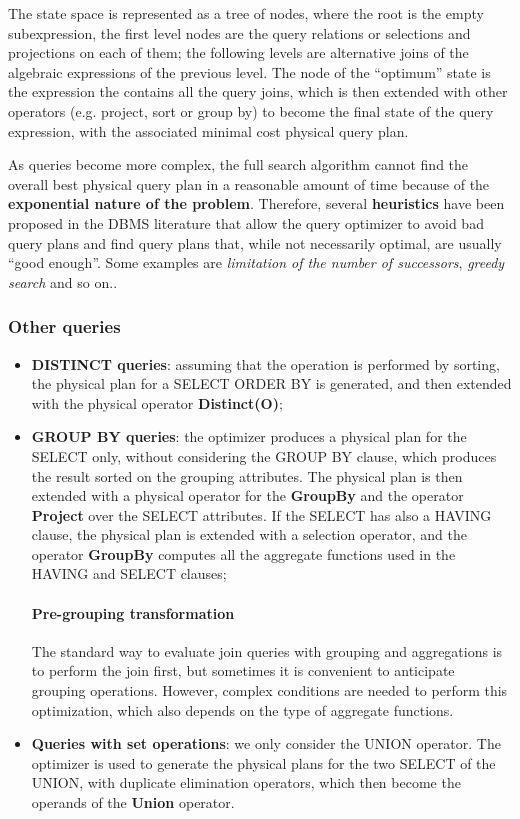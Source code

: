 The state space is represented as a tree of nodes, where the root is the empty subexpression, the first level nodes are the query relations or selections and projections on each of them; the following levels are alternative joins of the algebraic expressions of the previous level. The node of the “optimum” state is the expression the contains all the query joins, which is then extended with other operators (e.g. project, sort or group by) to become the final state of the query expression, with the associated minimal cost physical query plan. 

As queries become more complex, the full search algorithm cannot find the overall best physical query plan in a reasonable amount of time because of the \textbf{exponential nature of the problem}. Therefore, several \textbf{heuristics} have been proposed in the DBMS literature that allow the query optimizer to avoid bad query plans and find query plans that, while not necessarily optimal, are usually “good enough”. Some examples are \textit{limitation of the number of successors}, \textit{greedy search} and so on..

\subsubsection{Other queries}

\begin{itemize}

    \item \textbf{DISTINCT queries}: assuming that the operation is performed by sorting, the physical plan for a SELECT ORDER BY is generated, and then extended with the physical operator \textbf{Distinct(O)};
    
    \item \textbf{GROUP BY queries}: the optimizer produces a physical plan for the SELECT only, without considering the GROUP BY clause, which produces the result sorted on the grouping attributes. The physical plan is then extended with a physical operator for the \textbf{GroupBy} and the operator \textbf{Project} over the SELECT attributes. If the SELECT has also a HAVING clause, the physical plan is extended with a selection operator, and the operator \textbf{GroupBy} computes all the aggregate functions used in the HAVING and SELECT clauses;

    \paragraph{Pre-grouping transformation}
    The standard way to evaluate join queries with grouping and aggregations is to perform the join first, but sometimes it is convenient to anticipate grouping operations. However, complex conditions are needed to perform this optimization, which also depends on the type of aggregate functions.

    \item \textbf{Queries with set operations}: we only consider the UNION operator. The optimizer is used to generate the physical plans for the two SELECT of the UNION, with duplicate elimination operators, which then become the operands of the \textbf{Union} operator.

    
\end{itemize}